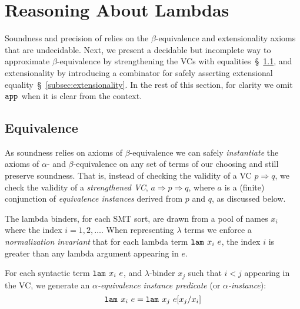 \section{Reasoning About Lambdas}\label{sec:lambdas}

Soundness and precision of \corelan relies 
on the $\beta$-equivalence and extensionality axioms that are undecidable. 
%
Next, we present a decidable but incomplete way 
to approximate $\beta$-equivalence
by strengthening the VCs with equalities~\S~\ref{subsec:equivalences},
and extensionality by introducing a combinator for safely asserting
extensional equality~\S~\ref{subsec:extensionality}.
%
In the rest of this section, 
for clarity we omit $\smtappname{}{}$ when it is clear from the context.

\subsection{Equivalence}\label{subsec:equivalences}

As soundness relies on axioms of $\beta$-equivalence
we can safely \emph{instantiate} the axioms of
$\alpha$- and $\beta$-equivalence on any set of
terms of our choosing and still preserve soundness.
%
That is, instead of checking the validity
of a VC
${p \Rightarrow q}$,
we check the validity of a \emph{strengthened VC},
${a \Rightarrow p \Rightarrow q}$,
where $a$ is a (finite) conjunction
of \emph{equivalence instances}
derived from $p$ and $q$,
as discussed below.


%
The lambda binders,
for each SMT sort, are drawn from a
pool of names $x_i$ where the index
$i=1,2,\ldots$.
%
When representing
$\lambda$ terms we enforce
a \emph{normalization invariant}
that for each lambda term
$\slam{x_i}{e}$, the index $i$
is greater than any lambda
argument appearing in $e$.

For each syntactic term
${\slam{x_i}{e}}$, and $\lambda$-binder
$x_j$ such that $i < j$ appearing in the VC,
we generate an \emph{$\alpha$-equivalence instance predicate}
(or \emph{$\alpha$-instance}):
$$\slam{x_i}{e} = \slam{x_j}{e \subst{x_i}{x_j}}$$

%

